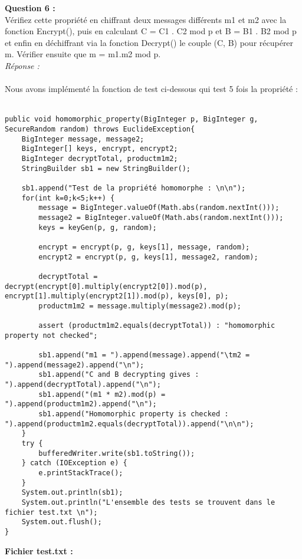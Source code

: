 \documentclass[a4paper,11pt]{article}
\begin{document}
        \textbf{Question 6 : \\}Vérifiez cette propriété en chiffrant deux messages différents m1 et m2 avec la fonction Encrypt(), puis en calculant C = C1 . C2 mod p et B = B1 . B2 mod p et enfin en déchiffrant via la fonction Decrypt() le couple (C, B) pour récupérer m. Vérifier ensuite que m = m1.m2 mod p.
        \textit{\\Réponse :} \\\\Nous avons implémenté la fonction de test ci-dessous qui test 5 fois la propriété : \\\\\begin{lstlisting}
public void homomorphic_property(BigInteger p, BigInteger g, SecureRandom random) throws EuclideException{
    BigInteger message, message2;
    BigInteger[] keys, encrypt, encrypt2;
    BigInteger decryptTotal, productm1m2;
    StringBuilder sb1 = new StringBuilder();

    sb1.append("Test de la propriété homomorphe : \n\n");
    for(int k=0;k<5;k++) {
        message = BigInteger.valueOf(Math.abs(random.nextInt()));
        message2 = BigInteger.valueOf(Math.abs(random.nextInt()));
        keys = keyGen(p, g, random);

        encrypt = encrypt(p, g, keys[1], message, random);
        encrypt2 = encrypt(p, g, keys[1], message2, random);

        decryptTotal = decrypt(encrypt[0].multiply(encrypt2[0]).mod(p), encrypt[1].multiply(encrypt2[1]).mod(p), keys[0], p);
        productm1m2 = message.multiply(message2).mod(p);

        assert (productm1m2.equals(decryptTotal)) : "homomorphic property not checked";

        sb1.append("m1 = ").append(message).append("\tm2 = ").append(message2).append("\n");
        sb1.append("C and B decrypting gives : ").append(decryptTotal).append("\n");
        sb1.append("(m1 * m2).mod(p) = ").append(productm1m2).append("\n");
        sb1.append("Homomorphic property is checked : ").append(productm1m2.equals(decryptTotal)).append("\n\n");
    }
    try {
        bufferedWriter.write(sb1.toString());
    } catch (IOException e) {
        e.printStackTrace();
    }
    System.out.println(sb1);
    System.out.println("L'ensemble des tests se trouvent dans le fichier test.txt \n");
    System.out.flush();
}
        \end{lstlisting}
        \textbf{Fichier test.txt : }
\end{document}
